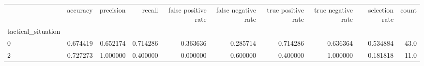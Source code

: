 \begin{tabular}{lrrrrrrrrr}
\toprule
{} &  accuracy &  precision &    recall &  false positive rate &  false negative rate &  true positive rate &  true negative rate &  selection rate &  count \\
tactical\_situation &           &            &           &                      &                      &                     &                     &                 &        \\
\midrule
0                  &  0.674419 &   0.652174 &  0.714286 &             0.363636 &             0.285714 &            0.714286 &            0.636364 &        0.534884 &   43.0 \\
2                  &  0.727273 &   1.000000 &  0.400000 &             0.000000 &             0.600000 &            0.400000 &            1.000000 &        0.181818 &   11.0 \\
\bottomrule
\end{tabular}
